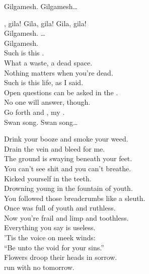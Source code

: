 Gilgamesh. Gilgamesh… \\


, gila! Gila, gila! Gila, gila! \\

Gilgamesh. … \\

Gilgamesh. \\

Such is this . \\
What a waste, a dead space. \\
Nothing matters when you're dead. \\
Such is this life, as I said. \\
Open questions can be asked in the . \\
No one will answer, though. \\
Go forth and , my . \\

Swan song. Swan song… \\




Drink your booze and smoke your weed. \\
Drain the vein and bleed for me. \\
The ground is swaying beneath your feet. \\
You can't see shit and you can't breathe. \\
Kicked yourself in the teeth. \\

Drowning young in the fountain of youth. \\
You followed those breadcrumbs like a sleuth. \\
Once was full of youth and ruthless. \\
Now you're frail and limp and toothless. \\
Everything you say is useless. \\

'Tis the  voice on meek winds: \\
``Be unto the void for your sins.'' \\
Flowers droop their heads in sorrow. \\
 run with no tomorrow. \\

